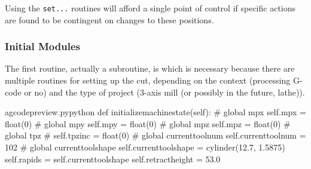 \documentclass{ltxdoc}
\begin{document}
\noindent Using the \verb|set...| routines will afford a single point of control if specific actions are found to be contingent on changes to these positions.



\subsubsection{Initial Modules}

The first routine, actually a subroutine, is  which is necessary because there are multiple routines for setting up the cut, depending on the context (processing G-code or no) and the type of project (3-axis mill (or possibly in the future, lathe)).

\lstset{firstnumber=\thegcpy}
\begin{writecode}{a}{gcodepreview.py}{python}
    def initializemachinestate(self):
#        global mpx
        self.mpx = float(0)
#        global mpy
        self.mpy = float(0)
#        global mpz
        self.mpz = float(0)
#        global tpz
#        self.tpzinc = float(0)
#        global currenttoolnum
        self.currenttoolnum = 102
#        global currenttoolshape
        self.currenttoolshape = cylinder(12.7, 1.5875)
        self.rapids = self.currenttoolshape
        self.retractheight = 53.0 
        
\end{writecode}
\addtocounter{gcpy}{16}
\end{document}

